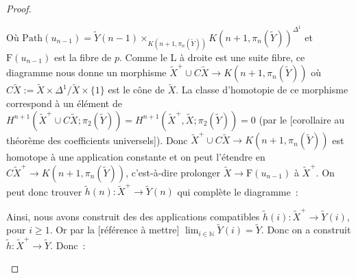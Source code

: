 \documentclass{amsart}
\theoremstyle{plain}
\theoremstyle{definition}
\theoremstyle{remark}
\newcommand{\ensemblenombre }[1]{\mathbb{#1}}
\newcommand{\N}{\ensemblenombre{N}}
\newcommand{\ra}{\rightarrow}
\begin{document}
\begin{proof}
  \begin{center}
  \end{center}
  Où $\mathrm{Path}(u_{n-1})={\tilde{Y}(n-1)\times_{K(n+1,\pi_n(\tilde{Y}))} K(n+1,\pi_n(\tilde{Y}))^{\Delta^1}}$ et $\mathrm{F}(u_{n-1})$
  est la fibre de $p$.
  Comme le L à droite est une suite fibre, ce diagramme nous donne un morphisme $\tilde{X}^+\cup C\tilde{X}\ra K(n+1,\pi_n(\tilde{Y}))$
  où $C\tilde{X}:=\tilde{X}\times\Delta^1 / \tilde{X}\times\{1\}$ est le cône de $\tilde{X}$.
  La classe d'homotopie de ce morphisme correspond à un élément de
  $H^{n+1}(\tilde{X}^+\cup C\tilde{X};\pi_2(\tilde{Y}))=H^{n+1}(\tilde{X}^+,\tilde{X};\pi_2(\tilde{Y}))=0$
  (par le [corollaire au théorème des coefficients universels]). Donc $\tilde{X}^+\cup C\tilde{X}\ra K(n+1,\pi_n(\tilde{Y}))$
  est homotope à une application constante et on peut l'étendre en $C\tilde{X}^+\ra K(n+1,\pi_n(\tilde{Y}))$,
  c'est-à-dire prolonger $\tilde{X}\ra \mathrm{F}(u_{n-1})$ à $\tilde{X}^+$. On peut donc trouver $\tilde{h}(n):\tilde{X}^+\ra \tilde{Y}(n)$
  qui complète le diagramme~:
  \begin{center}
  \end{center}
  Ainsi, nous avons construit des des applications compatibles $\tilde{h}(i):\tilde{X}^+\ra \tilde{Y}(i)$, pour $i\geq 1$.
  Or par la [référence à mettre] $\lim_{i\in \N}\tilde{Y}(i)=\tilde{Y}$. Donc on a construit $\tilde{h}:\tilde{X}^+\ra \tilde{Y}$.
  Donc~:
  \begin{center}

\end{center}
\end{proof}
\end{document}
